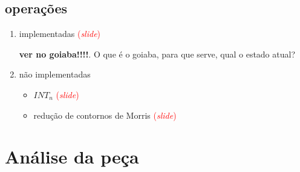 \documentclass[12pt,a4paper]{article}
\newcommand{\slide}{\textcolor{red}{(\textit{slide})}}
\begin{document}
\subsection{operações}

\begin{enumerate}
\item implementadas \slide{}

  \textbf{ver no goiaba!!!!}. O que é o goiaba, para que serve, qual o
  estado atual?
\item não implementadas
  \begin{itemize}
  \item $INT_n$ \slide{}
  \item redução de contornos de Morris \slide{}
  \end{itemize}
\end{enumerate}

\section{Análise da peça}
\end{document}
